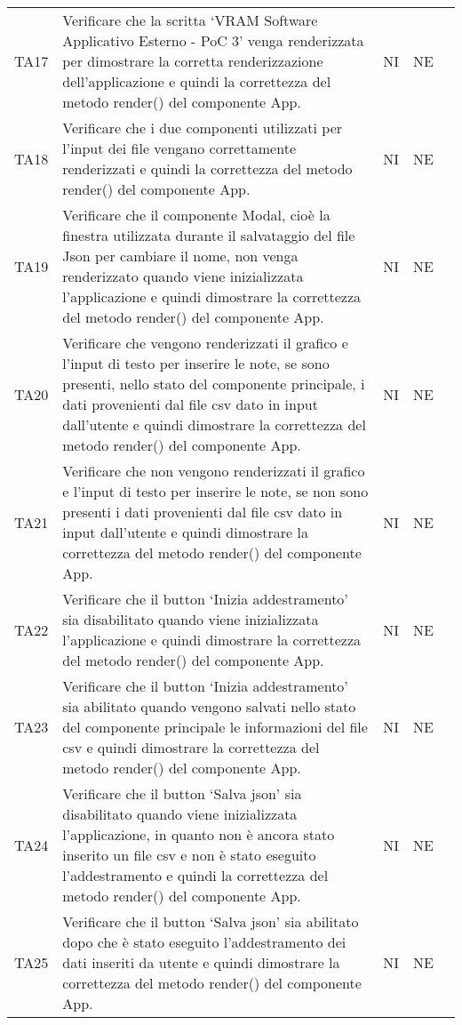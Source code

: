 \begin{longtable} {
		>{}p{15mm} 
		>{}p{79.5mm}
		>{}p{15mm} 
		>{}p{15mm}
		>{}p{0mm}}
	TA17	& Verificare che la scritta ‘VRAM Software Applicativo Esterno - PoC 3’ venga renderizzata per dimostrare la corretta renderizzazione dell’applicazione e quindi la correttezza del metodo render() del componente App. & NI & NE &\TBstrut \\ [2mm]
	TA18	& Verificare che i due componenti utilizzati per l’input dei file vengano correttamente renderizzati e quindi la correttezza del metodo render() del componente App. & NI & NE &\TBstrut \\ [2mm]
	TA19	& Verificare che il componente Modal, cioè la finestra utilizzata durante il salvataggio del file Json per cambiare il nome, non venga renderizzato quando viene inizializzata l’applicazione e quindi dimostrare la correttezza del metodo render() del componente App. & NI & NE &\TBstrut \\ [2mm]
	TA20	& Verificare che vengono renderizzati il grafico e l’input di testo per inserire le note, se sono presenti, nello stato del componente principale, i dati provenienti dal file csv dato in input dall’utente e quindi dimostrare la correttezza del metodo render() del componente App. & NI & NE &\TBstrut \\ [2mm]
	TA21	& Verificare che non vengono renderizzati il grafico e l’input di testo per inserire le note, se non sono presenti i dati provenienti dal file csv dato in input dall’utente e quindi dimostrare la correttezza del metodo render() del componente App. & NI & NE &\TBstrut \\ [2mm]
	TA22	& Verificare che il button ‘Inizia addestramento’ sia disabilitato quando viene inizializzata l’applicazione e quindi dimostrare la correttezza del metodo render() del componente App. & NI & NE &\TBstrut \\ [2mm]
	TA23	& Verificare che il button ‘Inizia addestramento’ sia abilitato quando vengono salvati nello stato del componente principale le informazioni del file csv e quindi dimostrare la correttezza del metodo render() del componente App. & NI & NE &\TBstrut \\ [2mm]
	TA24	& Verificare che il button ‘Salva json’ sia disabilitato quando viene inizializzata l’applicazione, in quanto non è ancora stato inserito un file csv e non è stato eseguito l’addestramento e quindi la correttezza del metodo render() del componente App. & NI & NE &\TBstrut \\ [2mm]
	TA25	& Verificare che il button ‘Salva json’ sia abilitato dopo che è stato eseguito l’addestramento dei dati inseriti da utente e quindi dimostrare la correttezza del metodo render() del componente App. & NI & NE &\TBstrut \\ [2mm]

\end{longtable}
